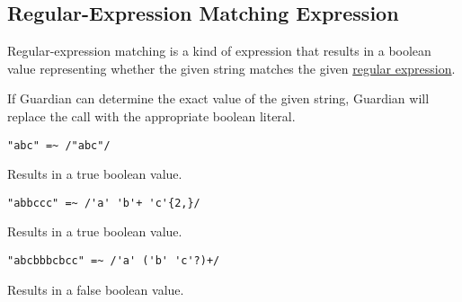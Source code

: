 
\subsection{Regular-Expression Matching Expression}
{
	Regular-expression matching is a kind of expression that results in
	a boolean value representing whether the given string matches
	the given \hyperref[sec:regex]{regular expression}.
	
	If Guardian can determine the exact value of the given string,
	Guardian will replace the call with the appropriate boolean literal.
	
	\begin{itemize}
	{
		\item[] \lstinline[language=MAIA, columns=fixed]@"abc" =~ /"abc"/@
		
			Results in a true boolean value.
		
		\item[] \lstinline[language=MAIA, columns=fixed]@"abbccc" =~ /'a' 'b'+ 'c'{2,}/@
		
			Results in a true boolean value.
		
		\item[] \lstinline[language=MAIA, columns=fixed]@"abcbbbcbcc" =~ /'a' ('b' 'c'?)+/@
		
			Results in a false boolean value.
	}
	\end{itemize}
}
